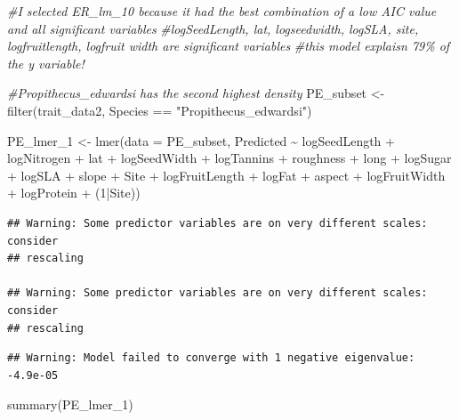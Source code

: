 \documentclass[
  12pt,
]{article}
\newenvironment{Shaded}{\begin{snugshade}}{\end{snugshade}}
\newcommand{\AttributeTok}[1]{\textcolor[rgb]{0.77,0.63,0.00}{#1}}
\newcommand{\CommentTok}[1]{\textcolor[rgb]{0.56,0.35,0.01}{\textit{#1}}}
\newcommand{\DecValTok}[1]{\textcolor[rgb]{0.00,0.00,0.81}{#1}}
\newcommand{\FunctionTok}[1]{\textcolor[rgb]{0.00,0.00,0.00}{#1}}
\newcommand{\NormalTok}[1]{#1}
\newcommand{\OtherTok}[1]{\textcolor[rgb]{0.56,0.35,0.01}{#1}}
\newcommand{\SpecialCharTok}[1]{\textcolor[rgb]{0.00,0.00,0.00}{#1}}
\newcommand{\StringTok}[1]{\textcolor[rgb]{0.31,0.60,0.02}{#1}}
\begin{document}
\begin{Shaded}
\begin{Highlighting}[]
\CommentTok{\#I selected ER\_lm\_10 because it had the best combination of a low AIC value and all significant variables}
\CommentTok{\#logSeedLength, lat, logseedwidth, logSLA, site, logfruitlength, logfruit width are significant variables}
\CommentTok{\#this model explaisn 79\% of the y variable!}

\CommentTok{\#Propithecus\_edwardsi has the second highest density}
\NormalTok{PE\_subset }\OtherTok{\textless{}{-}} \FunctionTok{filter}\NormalTok{(trait\_data2, Species }\SpecialCharTok{==} \StringTok{"Propithecus\_edwardsi"}\NormalTok{)}


\NormalTok{PE\_lmer\_1 }\OtherTok{\textless{}{-}} \FunctionTok{lmer}\NormalTok{(}\AttributeTok{data =}\NormalTok{ PE\_subset, Predicted }\SpecialCharTok{\textasciitilde{}}\NormalTok{ logSeedLength }\SpecialCharTok{+}\NormalTok{ logNitrogen }\SpecialCharTok{+}\NormalTok{ lat }\SpecialCharTok{+}\NormalTok{ logSeedWidth }\SpecialCharTok{+}\NormalTok{ logTannins }\SpecialCharTok{+}\NormalTok{ roughness }\SpecialCharTok{+}\NormalTok{ long }\SpecialCharTok{+}\NormalTok{ logSugar }\SpecialCharTok{+}\NormalTok{ logSLA }\SpecialCharTok{+}\NormalTok{ slope }\SpecialCharTok{+}\NormalTok{ Site }\SpecialCharTok{+}\NormalTok{ logFruitLength }\SpecialCharTok{+}\NormalTok{ logFat }\SpecialCharTok{+}\NormalTok{ aspect }\SpecialCharTok{+}\NormalTok{ logFruitWidth }\SpecialCharTok{+}\NormalTok{ logProtein }\SpecialCharTok{+}\NormalTok{ (}\DecValTok{1}\SpecialCharTok{|}\NormalTok{Site))}
\end{Highlighting}
\end{Shaded}

\begin{verbatim}
## Warning: Some predictor variables are on very different scales: consider
## rescaling

## Warning: Some predictor variables are on very different scales: consider
## rescaling
\end{verbatim}

\begin{verbatim}
## Warning: Model failed to converge with 1 negative eigenvalue: -4.9e-05
\end{verbatim}

\begin{Shaded}
\begin{Highlighting}[]
\FunctionTok{summary}\NormalTok{(PE\_lmer\_1)}
\end{Highlighting}
\end{Shaded}
\end{document}
